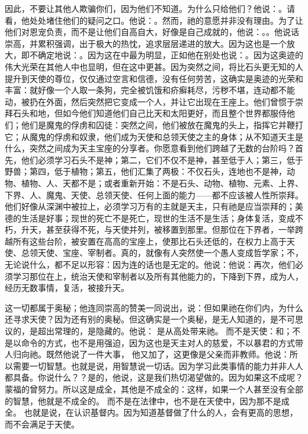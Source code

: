 因此，不要让其他人欺骗你们，因为他们不知道。为什么只给他们？他说：。请看，他处处堵住他们的疑问之口。他说：。然而，祂的意愿并非没有理由。为了让他们对恩宠负责，而不是让他们自高自大，好像是自己成就的，他说：。。他说话崇高，并累积强调，出于极大的热忱，追求层层递进的放大。因为这也是一个放大，即不确定地说：。因为这在中最为明显，正如他在别处也说：。因为这奥迹的伟大光荣在其他人中也显明，但在这中更甚。因为突然之间，将比石头更无知的人提升到天使的尊位，仅仅通过空言和信德，没有任何劳苦，这确实是奥迹的光荣和丰富：就好像一个人取一条狗，完全被饥饿和疥癣耗尽，污秽不堪，连动都不能动，被扔在外面，然后突然把它变成一个人，并让它出现在王座上。他们曾惯于崇拜石头和地，但如今他们知道他们自己比天和太阳更好，而且整个世界都服侍他们；他们是魔鬼的俘虏和囚徒：突然之间，他们被放在魔鬼的头上，指挥它并鞭打它；从魔鬼的俘虏和奴隶，他们成为天使和总领天使之主的身体；从不知道天主是什么，突然之间成为天主宝座的分享者。你愿意看到他们跨越了无数的台阶吗？首先，他们必须学习石头不是神；第二，它们不仅不是神，甚至低于人；第三，低于野兽；第四，低于植物；第五，他们汇集了两极：不仅石头，连地也不是神，动物、植物、人、天都不是；或者重新开始：不是石头、动物、植物、元素、上界、下界、人、魔鬼、天使、总领天使、任何上面的能力——都不应该被人性所崇拜。他们好像从深渊中被拉上，必须学习万有的主就是天主，只有祂是应当崇拜的；美德的生活是好事；现世的死亡不是死亡，现世的生活不是生活；身体复活，变成不朽，升天，甚至获得不死，与天使并列，被移置到那里。但那位在下界者，一举跨越所有这些台阶，被安置在高高的宝座上，使那比石头还低的，在权力上高于天使、总领天使、宝座、宰制者。真的，就像有人突然使一个愚人变成哲学家；不，无论说什么，都不足以形容：因为连的话也是无定的。他说：他说：再次，他们必须学习那位在上，统治天使和宰制者以及所有其他能力的，下降到下界，成为人，经历无数事情，复活，被接升天。\par

这一切都属于奥秘；他连同崇高的赞美一同说出，说：但如果祂在你们内，为什么还寻求天使？因为还有别的奥秘。但这确实是一个奥秘，是无人知道的，是不可思议的，是超出常理的，是隐藏的。他说：  是从高处带来祂。 而不是天使：和；不是以命令的方式，也不是用强迫，因为这也是天主对人的慈爱，不以暴君的方式带人归向祂。既然他说了一件大事， 他又加了，这更像是父亲而非教师。他说：所以需要一切智慧。也就是说，用智慧说一切话。因为学习此类事情的能力并非人人都具备。你说什么？？是的，他说，这是我们热切渴望做的。因为如果这不成呢？蒙福的曾努力。所以这是成全，其他是不成全的：这样，如果一个人甚至没有全部的智慧，他就是不成全的。 而不是在法律中，也不是在天使中，因为那不是成全。 也就是说，在认识基督内。因为知道基督做了什么的人，会有更高的思想，而不会满足于天使。\par


